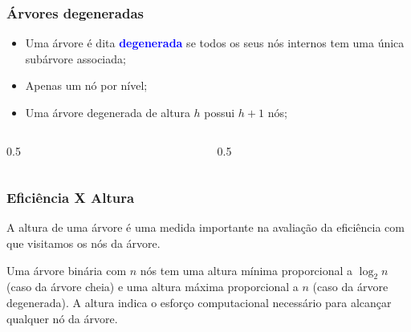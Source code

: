\documentclass{beamer}
\newcommand{\tcb}[1]{\textcolor{blue}{\textbf{#1}}}
\begin{document}
\begin{frame}
  \frametitle{Árvores degeneradas}

  \begin{itemize}
    \item Uma árvore é dita \tcb{degenerada} se todos os seus
      nós internos tem uma única subárvore associada;
    \item Apenas um nó por nível;
    \item Uma árvore degenerada de altura $h$ possui $h+1$ nós;
  \end{itemize}

  \vspace{1cm}

  \begin{columns}
    \begin{column}{0.5\textwidth}
      \centering
    \end{column}
    \begin{column}{0.5\textwidth}
      \centering
    \end{column}
  \end{columns}

\end{frame}

\begin{frame}[c]
  \frametitle{Eficiência X Altura}

  \centering
  A altura de uma árvore é uma medida importante 
  na avaliação da eficiência com que visitamos os 
  nós da árvore. 

  \vspace{1cm}

  Uma árvore binária com $n$ nós tem uma altura mínima
  proporcional a $\log_2{n}$ (caso da árvore cheia) e
  uma altura máxima proporcional a $n$ (caso da árvore 
  degenerada). A altura indica o esforço computacional 
  necessário para alcançar qualquer nó da árvore.
\end{frame}
\end{document}
